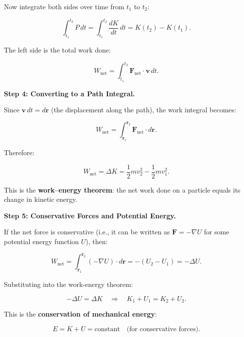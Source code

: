 Now integrate both sides over time from $t_1$ to $t_2$:

\begin{equation}
\int_{t_1}^{t_2} P\,dt = \int_{t_1}^{t_2} \frac{dK}{dt}\,dt = K(t_2) - K(t_1).
\end{equation}

The left side is the total work done:

\begin{equation}
W_{\text{net}} = \int_{t_1}^{t_2} \mathbf{F}_{\text{net}}\cdot\mathbf{v}\,dt.
\end{equation}

\textbf{Step 4: Converting to a Path Integral.}

Since $\mathbf{v}\,dt = d\mathbf{r}$ (the displacement along the path), the work integral becomes:

\begin{equation}
W_{\text{net}} = \int_{\mathbf{r}_1}^{\mathbf{r}_2} \mathbf{F}_{\text{net}}\cdot d\mathbf{r}.
\end{equation}

Therefore:

\begin{equation}
\boxed{W_{\text{net}} = \Delta K = \frac{1}{2}mv_2^2 - \frac{1}{2}mv_1^2.}
\end{equation}

This is the \textbf{work--energy theorem}: the net work done on a particle equals its change in kinetic energy.

\textbf{Step 5: Conservative Forces and Potential Energy.}

If the net force is conservative (i.e., it can be written as $\mathbf{F} = -\nabla U$ for some potential energy function $U$), then:

\begin{equation}
W_{\text{net}} = \int_{\mathbf{r}_1}^{\mathbf{r}_2} (-\nabla U)\cdot d\mathbf{r} = -(U_2 - U_1) = -\Delta U.
\end{equation}

Substituting into the work-energy theorem:

\begin{equation}
-\Delta U = \Delta K \quad \Longrightarrow \quad K_1 + U_1 = K_2 + U_2.
\end{equation}

This is the \textbf{conservation of mechanical energy}:

\begin{equation}
\boxed{E = K + U = \text{constant} \quad \text{(for conservative forces)}.}
\end{equation}

